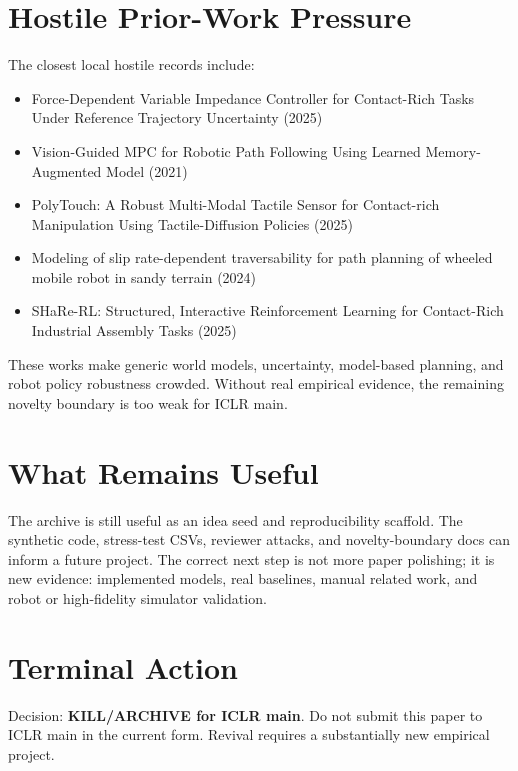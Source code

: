 \documentclass{article}
\begin{document}
\section{Hostile Prior-Work Pressure}
The closest local hostile records include:
\begin{itemize}
\item Force-Dependent Variable Impedance Controller for Contact-Rich Tasks Under Reference Trajectory Uncertainty (2025)
\item Vision-Guided MPC for Robotic Path Following Using Learned Memory-Augmented Model (2021)
\item PolyTouch: A Robust Multi-Modal Tactile Sensor for Contact-rich Manipulation Using Tactile-Diffusion Policies (2025)
\item Modeling of slip rate-dependent traversability for path planning of wheeled mobile robot in sandy terrain (2024)
\item SHaRe-RL: Structured, Interactive Reinforcement Learning for Contact-Rich Industrial Assembly Tasks (2025)
\end{itemize}
These works make generic world models, uncertainty, model-based planning, and robot policy robustness crowded. Without real empirical evidence, the remaining novelty boundary is too weak for ICLR main.

\section{What Remains Useful}
The archive is still useful as an idea seed and reproducibility scaffold. The synthetic code, stress-test CSVs, reviewer attacks, and novelty-boundary docs can inform a future project. The correct next step is not more paper polishing; it is new evidence: implemented models, real baselines, manual related work, and robot or high-fidelity simulator validation.

\section{Terminal Action}
Decision: \textbf{KILL/ARCHIVE for ICLR main}. Do not submit this paper to ICLR main in the current form. Revival requires a substantially new empirical project.
\end{document}
